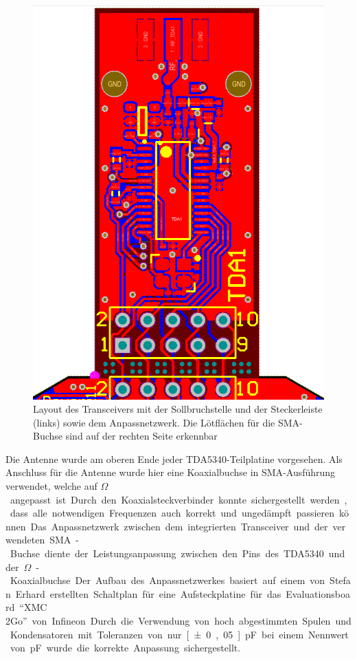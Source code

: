 \begin{figure}[h]
\centering
\includegraphics[trim=4.3cm 0cm 4.4cm 0cm, clip=true, totalheight=0.5\textheight,angle=-90]{Abbildungen/Aufnahmen/Bilder/Altium/TDA}
\caption[Layout des Transceivers]{Layout des Transceivers mit der Sollbruchstelle und der Steckerleiste (links) sowie dem Anpassnetzwerk. Die Lötflächen für die SMA-Buchse sind auf der rechten Seite erkennbar}
\label{fig:tdalayout}

\end{figure}

 
Die Antenne wurde am oberen Ende jeder TDA5340-Teilplatine vorgesehen. Als Anschluss für die Antenne wurde hier eine Koaxialbuchse in \ac{SMA}-Ausführung verwendet, welche auf \unit[50]{$\Omega$} angepasst ist. Durch den Koaxialsteckverbinder konnte sichergestellt werden, dass alle notwendigen Frequenzen auch korrekt und ungedämpft passieren können. 
Das Anpassnetzwerk zwischen dem  integrierten Transceiver und der verwendeten \ac{SMA}-Buchse diente der Leistungsanpassung zwischen den Pins des TDA5340 und der \unit[50]{$\Omega$}-Koaxialbuchse. Der Aufbau des Anpassnetzwerkes basiert auf einem von Stefan Erhard erstellten Schaltplan für eine Aufsteckplatine für das Evaluationsboard \enquote{XMC 2Go} von Infineon. Durch die Verwendung von hoch abgestimmten Spulen und Kondensatoren mit Toleranzen von nur \unit[±0,05]{pF} bei einem Nennwert von \unit[2,5]{pF} wurde die korrekte Anpassung sichergestellt. 
 


